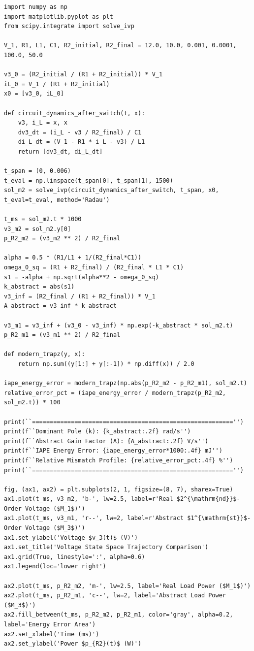 \documentclass[11pt, a4paper]{article}
\begin{document}
{\footnotesize
\begin{verbatim}
import numpy as np
import matplotlib.pyplot as plt
from scipy.integrate import solve_ivp

V_1, R1, L1, C1, R2_initial, R2_final = 12.0, 10.0, 0.001, 0.0001, 100.0, 50.0

v3_0 = (R2_initial / (R1 + R2_initial)) * V_1
iL_0 = V_1 / (R1 + R2_initial)
x0 = [v3_0, iL_0]

def circuit_dynamics_after_switch(t, x):
    v3, i_L = x, x
    dv3_dt = (i_L - v3 / R2_final) / C1
    di_L_dt = (V_1 - R1 * i_L - v3) / L1
    return [dv3_dt, di_L_dt]

t_span = (0, 0.006)
t_eval = np.linspace(t_span[0], t_span[1], 1500)
sol_m2 = solve_ivp(circuit_dynamics_after_switch, t_span, x0, t_eval=t_eval, method='Radau')

t_ms = sol_m2.t * 1000
v3_m2 = sol_m2.y[0]
p_R2_m2 = (v3_m2 ** 2) / R2_final

alpha = 0.5 * (R1/L1 + 1/(R2_final*C1))
omega_0_sq = (R1 + R2_final) / (R2_final * L1 * C1)
s1 = -alpha + np.sqrt(alpha**2 - omega_0_sq)
k_abstract = abs(s1)
v3_inf = (R2_final / (R1 + R2_final)) * V_1
A_abstract = v3_inf * k_abstract

v3_m1 = v3_inf + (v3_0 - v3_inf) * np.exp(-k_abstract * sol_m2.t)
p_R2_m1 = (v3_m1 ** 2) / R2_final

def modern_trapz(y, x):
    return np.sum((y[1:] + y[:-1]) * np.diff(x)) / 2.0

iape_energy_error = modern_trapz(np.abs(p_R2_m2 - p_R2_m1), sol_m2.t)
relative_error_pct = (iape_energy_error / modern_trapz(p_R2_m2, sol_m2.t)) * 100

print(``========================================================='')
print(f``Dominant Pole (k): {k_abstract:.2f} rad/s'')
print(f``Abstract Gain Factor (A): {A_abstract:.2f} V/s'')
print(f``IAPE Energy Error: {iape_energy_error*1000:.4f} mJ'')
print(f``Relative Mismatch Profile: {relative_error_pct:.4f} %'')
print(``========================================================='')

fig, (ax1, ax2) = plt.subplots(2, 1, figsize=(8, 7), sharex=True)
ax1.plot(t_ms, v3_m2, 'b-', lw=2.5, label=r'Real $2^{\mathrm{nd}}$-Order Voltage ($M_1$)')
ax1.plot(t_ms, v3_m1, 'r--', lw=2, label=r'Abstract $1^{\mathrm{st}}$-Order Voltage ($M_3$)')
ax1.set_ylabel('Voltage $v_3(t)$ (V)')
ax1.set_title('Voltage State Space Trajectory Comparison')
ax1.grid(True, linestyle=':', alpha=0.6)
ax1.legend(loc='lower right')

ax2.plot(t_ms, p_R2_m2, 'm-', lw=2.5, label='Real Load Power ($M_1$)')
ax2.plot(t_ms, p_R2_m1, 'c--', lw=2, label='Abstract Load Power ($M_3$)')
ax2.fill_between(t_ms, p_R2_m2, p_R2_m1, color='gray', alpha=0.2, label='Energy Error Area')
ax2.set_xlabel('Time (ms)')
ax2.set_ylabel('Power $p_{R2}(t)$ (W)')
\end{verbatim}
}
\end{document}
